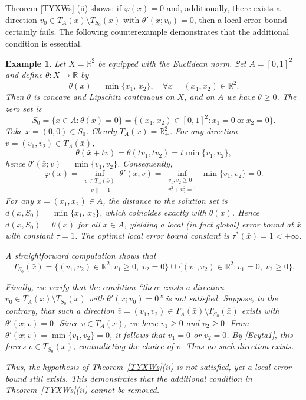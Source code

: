 \documentclass[11pt]{article}
\newtheorem{example}{Example}[section]
\begin{document}
Theorem  \ref{TYXWs} (ii) shows: if $	\varphi(\bar{x})=0$ and, additionally, there exists a direction $v_0\in T_A(\bar{x})\setminus T_{S_0}(\bar{x})$ with $\theta'(\bar{x};v_0)=0$, then a local error bound certainly fails.   The following counterexample demonstrates that the additional condition is essential.





\begin{example}
	Let $X=\mathbb{R}^2$ be equipped with the Euclidean norm.
	Set $A=[0,1]^2$ and define $\theta:X\to\mathbb{R}$ by
	\[
	\theta(x)=\min\{x_1,\,x_2\}, \quad  \forall x = (x_1,x_2)  \in \mathbb{R}^2.
	\]
	Then $\theta$ is concave and Lipschitz continuous on $X$, and on $A$ we have $\theta\ge0$.
	The zero set is
	\[
	S_0=\{x\in A:\theta(x)=0\}
	=\{(x_1,x_2)\in[0,1]^2 : x_1=0\ \text{or}\ x_2=0\}.
	\]
	Take $\bar{x}=(0,0)\in S_0$.
	Clearly $T_A(\bar{x})=\mathbb{R}^2_+$.
	For any direction $v=(v_1,v_2)\in T_A(\bar{x})$,
	\[
	\theta(\bar{x}+tv)=\theta(tv_1,tv_2)=t\min\{v_1,v_2\},
	\]
	hence $\theta'(\bar{x};v)=\min\{v_1,v_2\}$.
	Consequently,
	\[
	\varphi(\bar{x})=\inf_{\substack{v\in T_A(\bar{x})\\\|v\|=1}}
	\theta'(\bar{x};v)
	=\inf_{\substack{v_1,v_2\ge0\\ v_1^2+v_2^2=1}}
	\min\{v_1,v_2\}=0.
	\]
	For any $x=(x_1,x_2)\in A$, the distance to the solution set is $d(x,S_0) = \min\{x_1,\,x_2\}$, which coincides exactly with $\theta(x)$.  
	Hence $d(x,S_0) = \theta(x)$ for all $x\in A$, yielding a local (in fact global) error bound at $\bar{x}$ with constant $\tau=1$.  
	The optimal local error bound constant is $\tau^*(\bar{x}) = 1 < +\infty$.
	
	A straightforward computation shows that
	\begin{equation}\label{Ecyta1}
		T_{S_0}(\bar{x}) = \{(v_1,v_2) \in \mathbb{R}^2: v_1\ge0,\; v_2=0\} \cup \{(v_1,v_2)  \in \mathbb{R}^2: v_1=0,\; v_2\ge0\}.
	\end{equation}
	
	Finally, we verify that the condition ``there exists a direction $v_0\in T_A(\bar{x})\setminus T_{S_0}(\bar{x})$ with $\theta'(\bar{x};v_0)=0$'' is not satisfied.  
	Suppose, to the contrary, that such a direction $\bar{v}=(v_1,v_2)\in T_A(\bar{x})\setminus T_{S_0}(\bar{x})$ exists with $\theta'(\bar{x};\bar{v})=0$.  
	Since $\bar{v}\in T_A(\bar{x})$, we have $v_1\ge0$ and $v_2\ge0$.  From $\theta'(\bar{x};\bar{v}) = \min\{v_1,v_2\}=0$, it follows that $v_1=0$ or $v_2=0$.  By \eqref{Ecyta1}, this forces $\bar{v}\in T_{S_0}(\bar{x})$, contradicting the choice of $\bar{v}$.  
	Thus no such direction exists.
	
	Thus, the hypothesis of Theorem~\ref{TYXWs}(ii) is not satisfied, yet a local error bound still exists. This demonstrates that the additional condition in Theorem~\ref{TYXWs}(ii) cannot be removed.
\end{example}
\end{document}
